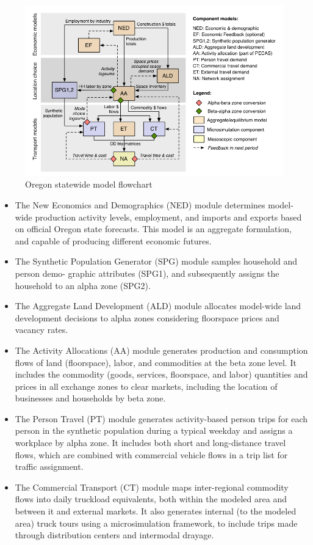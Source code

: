 \begin{figure}
\centering
\includegraphics[width=6.0in]{graphics/58-oregon-model-flowchart}
\caption{Oregon statewide model flowchart}
\label{fig:oregon-flowchart}
\end{figure}

\begin{itemize}
\item
The New Economics and Demographics (NED) module determines model-wide production activity levels, employment, and imports and exports based on official Oregon state forecasts. This model is an aggregate formulation, and capable of producing different economic futures.
\item
The Synthetic Population Generator (SPG) module samples household and person demo- graphic attributes (SPG1), and subsequently assigns the household to an alpha zone (SPG2).
\item
The Aggregate Land Development (ALD) module allocates model-wide land development decisions to alpha zones considering floorspace prices and vacancy rates.
\item
The Activity Allocations (AA) module generates production and consumption flows of land (floorspace), labor, and commodities at the beta zone level. It includes the commodity (goods, services, floorspace, and labor) quantities and prices in all exchange zones to clear markets, including the location of businesses and households by beta zone.
\item
The Person Travel (PT) module generates activity-based person trips for each person in the synthetic population during a typical weekday and assigns a workplace by alpha zone. It includes both short and long-distance travel flows, which are combined with commercial vehicle flows in a trip list for traffic assignment.
\item
The Commercial Transport (CT) module maps inter-regional commodity flows into daily truckload equivalents, both within the modeled area and between it and external markets. It also generates internal (to the modeled area) truck tours using a microsimulation framework, to include trips made through distribution centers and intermodal drayage.
\end{itemize}


